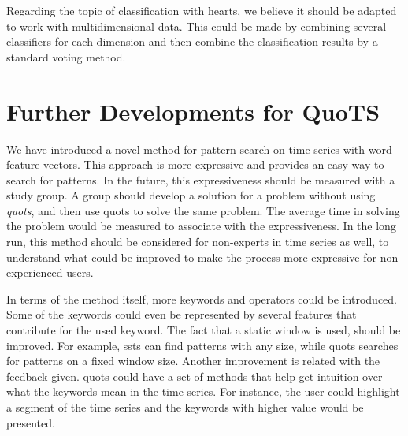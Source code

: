 \par
Regarding the topic of classification with \gls{hearts}, we believe it should be adapted to work with multidimensional data. This could be made by combining several classifiers for each dimension and then combine the classification results by a standard voting method. 





\section{Further Developments for QuoTS}

We have introduced a novel method for pattern search on time series with word-feature vectors. This approach is more expressive and provides an easy way to search for patterns. In the future, this expressiveness should be measured with a study group. A group should develop a solution for a problem without using \textit{quots}, and then use \gls{quots} to solve the same problem. The average time in solving the problem would be measured to associate with the expressiveness.  In the long run, this method should be considered for non-experts in time series as well, to understand what could be improved to make the process more expressive for non-experienced users.
\par
In terms of the method itself, more keywords and operators could be introduced. Some of the keywords could even be represented by several features that contribute for the used keyword. The fact that a static window is used, should be improved. For example, \gls{ssts} can find patterns with any size, while \gls{quots} searches for patterns on a fixed window size. Another improvement is related with the feedback given. \gls{quots} could have a set of methods that help get intuition over what the keywords mean in the time series. For instance, the user could highlight a segment of the time series and the keywords with higher value would be presented.